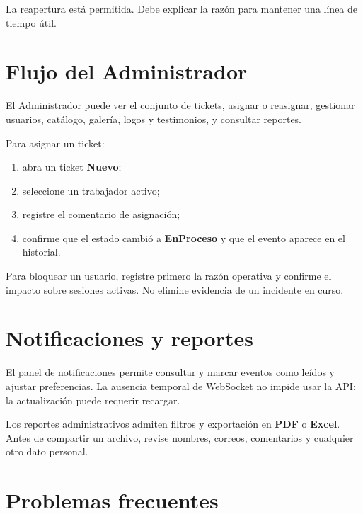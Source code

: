 La reapertura está permitida. Debe explicar la razón para mantener una línea de tiempo útil.

\section{Flujo del Administrador}

El Administrador puede ver el conjunto de tickets, asignar o reasignar, gestionar usuarios,
catálogo, galería, logos y testimonios, y consultar reportes.

Para asignar un ticket:

\begin{enumerate}
  \item abra un ticket \textbf{Nuevo};
  \item seleccione un trabajador activo;
  \item registre el comentario de asignación;
  \item confirme que el estado cambió a \textbf{EnProceso} y que el evento aparece en el historial.
\end{enumerate}

Para bloquear un usuario, registre primero la razón operativa y confirme el impacto sobre sesiones
activas. No elimine evidencia de un incidente en curso.

\section{Notificaciones y reportes}

El panel de notificaciones permite consultar y marcar eventos como leídos y ajustar preferencias.
La ausencia temporal de WebSocket no impide usar la API; la actualización puede requerir recargar.

Los reportes administrativos admiten filtros y exportación en \textbf{PDF} o \textbf{Excel}. Antes
de compartir un archivo, revise nombres, correos, comentarios y cualquier otro dato personal.

\section{Problemas frecuentes}

